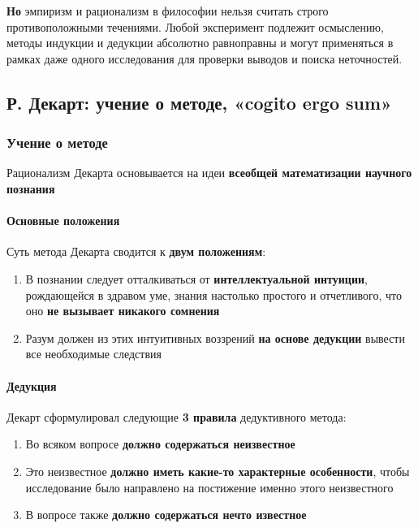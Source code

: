 \documentclass{article}
\begin{document}
\begin{flushleft}
\hfill

\textbf{Но} эмпиризм и рационализм в философии нельзя считать строго противоположными течениями. Любой эксперимент подлежит осмыслению, методы индукции и дедукции абсолютно равноправны и могут применяться в рамках даже одного исследования для проверки выводов и поиска неточностей.

\subsection{Р. Декарт: учение о методе, «cogito ergo sum»}

\subsubsection{Учение о методе}

Рационализм Декарта основывается на идеи \textbf{всеобщей математизации научного познания}

\paragraph{Основные положения}

Суть метода Декарта сводится к \textbf{двум положениям}:

\begin{enumerate}
    \item В познании следует отталкиваться от \textbf{интеллектуальной интуиции}, рождающейся в здравом уме, знания настолько простого и отчетливого, что оно \textbf{не вызывает никакого сомнения}
    \item Разум должен из этих интуитивных воззрений \textbf{на основе дедукции} вывести все необходимые следствия
\end{enumerate}

\paragraph{Дедукция}

Декарт сформулировал следующие \textbf{3 правила} дедуктивного метода:

\begin{enumerate}
    \item Во всяком вопросе \textbf{должно содержаться неизвестное}
    \item Это неизвестное \textbf{должно иметь какие-то характерные особенности}, чтобы исследование было направлено на постижение именно этого неизвестного
    \item В вопросе также \textbf{должно содержаться нечто известное}
\end{enumerate}


\end{flushleft}
\end{document}
